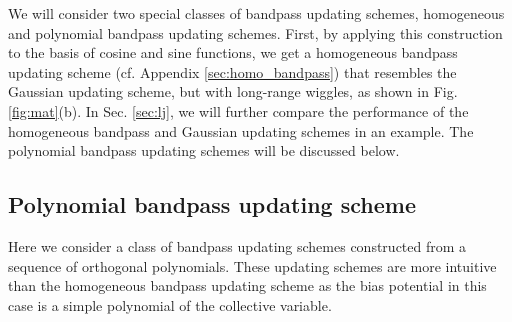 \documentclass[reprint, superscriptaddress, floatfix]{revtex4-1}
\newcommand{\note}[1]{{\color{DarkGreen}\footnotesize \textsc{Note.} #1}}
\begin{document}
We will consider two special classes of bandpass updating schemes,
homogeneous and polynomial bandpass updating schemes.
%
%
First,
by applying this construction to the basis of cosine and sine functions,
we get a homogeneous bandpass updating scheme
(cf. Appendix \ref{sec:homo_bandpass})
that resembles the Gaussian updating scheme,
but with long-range wiggles,
as shown in Fig. \ref{fig:mat}(b).
%
In Sec. \ref{sec:lj},
we will further compare the performance of
the homogeneous bandpass and Gaussian updating schemes
in an example.
%
%
%
The polynomial bandpass updating schemes will be discussed below.







\subsection{\label{sec:bandpass_poly}
Polynomial bandpass updating scheme}


Here we consider a class of bandpass updating schemes
constructed from a sequence of orthogonal polynomials.
%
These updating schemes are more intuitive
than the homogeneous bandpass updating scheme
as the bias potential in this case is
a simple polynomial of the collective variable.
\end{document}
